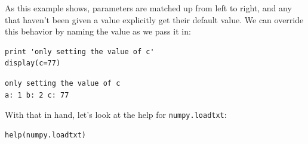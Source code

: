 \documentclass{book}
\begin{document}
As this example shows, parameters are matched up from left to right, and
any that haven't been given a value explicitly get their default value.
We can override this behavior by naming the value as we pass it in:

\begin{verbatim}
print 'only setting the value of c'
display(c=77)
\end{verbatim}

\begin{verbatim}
only setting the value of c
a: 1 b: 2 c: 77
\end{verbatim}

With that in hand, let's look at the help for \texttt{numpy.loadtxt}:

\begin{verbatim}
help(numpy.loadtxt)
\end{verbatim}
\end{document}
